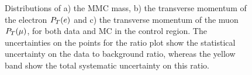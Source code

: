 \begin{figure}[tp]
     \begin{center}


    \end{center}
    \caption{ Distributions  of a) the MMC mass, b) the transverse momentum of the electron $P_{T}(e)$ and c) the transverse momentum of the muon $P_{T}(\mu)$, for both data and MC in the \ttbar control region. The uncertainties on the points for the ratio plot show the statistical uncertainty on the data to background ratio, whereas the yellow band show the total systematic uncertainty on this ratio.} 
   \label{fig:kinematicsttbar}
\end{figure}


